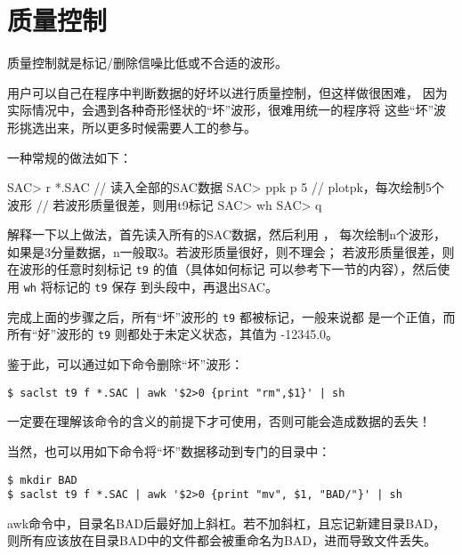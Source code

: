 \section{质量控制}

质量控制就是标记/删除信噪比低或不合适的波形。

用户可以自己在程序中判断数据的好坏以进行质量控制，但这样做很困难，
因为实际情况中，会遇到各种奇形怪状的``坏''波形，很难用统一的程序将
这些``坏''波形挑选出来，所以更多时候需要人工的参与。

一种常规的做法如下：
\begin{SACCode}
SAC> r *.SAC        // 读入全部的SAC数据
SAC> ppk p 5        // plotpk，每次绘制5个波形
// 若波形质量很差，则用t9标记
SAC> wh
SAC> q
\end{SACCode}

解释一下以上做法，首先读入所有的SAC数据，然后利用 ，
每次绘制n个波形，如果是3分量数据，n一般取3。若波形质量很好，则不理会；
若波形质量很差，则在波形的任意时刻标记 \texttt{t9} 的值（具体如何标记
可以参考下一节的内容），然后使用 \texttt{wh} 将标记的 \texttt{t9} 保存
到头段中，再退出SAC。

完成上面的步骤之后，所有``坏''波形的 \texttt{t9} 都被标记，一般来说都
是一个正值，而所有``好''波形的 \texttt{t9} 则都处于未定义状态，其值为
-12345.0。

鉴于此，可以通过如下命令删除``坏''波形：
\begin{verbatim}
$ saclst t9 f *.SAC | awk '$2>0 {print "rm",$1}' | sh
\end{verbatim}
\begin{note}
一定要在理解该命令的含义的前提下才可使用，否则可能会造成数据的丢失！
\end{note}

当然，也可以用如下命令将``坏''数据移动到专门的目录中：
\begin{verbatim}
$ mkdir BAD
$ saclst t9 f *.SAC | awk '$2>0 {print "mv", $1, "BAD/"}' | sh
\end{verbatim}
\begin{note}
awk命令中，目录名BAD后最好加上斜杠。若不加斜杠，且忘记新建目录BAD，
则所有应该放在目录BAD中的文件都会被重命名为BAD，进而导致文件丢失。
\end{note}
